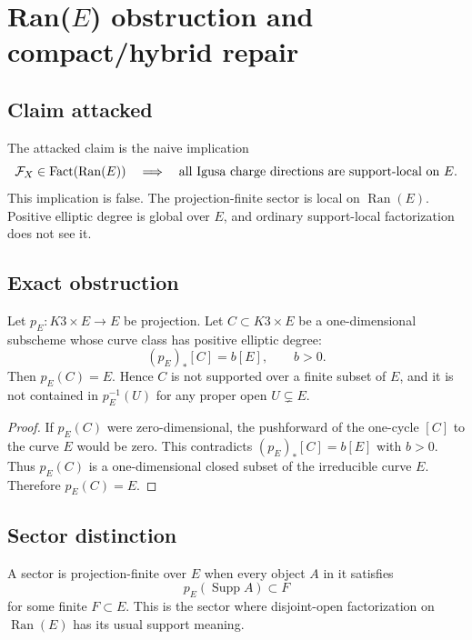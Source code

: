 \section{Ran(\(E\)) obstruction and compact/hybrid repair}
\label{sec:ranE-obstruction-attack-repair}

\subsection{Claim attacked}

The attacked claim is the naive implication
\[
\mathcal F_X\in\mathrm{Fact}(\operatorname{Ran}(E))
\quad\Longrightarrow\quad
\hbox{all Igusa charge directions are support-local on }E.
\]
This implication is false.  The projection-finite sector is local on
\(\operatorname{Ran}(E)\).  Positive elliptic degree is global over
\(E\), and ordinary support-local factorization does not see it.

\subsection{Exact obstruction}

\begin{theorem}
Let \(p_E:K3\times E\to E\) be projection.  Let
\(C\subset K3\times E\) be a one-dimensional subscheme whose curve class
has positive elliptic degree:
\[
(p_E)_*[C]=b[E],\qquad b>0.
\]
Then \(p_E(C)=E\).  Hence \(C\) is not supported over a finite subset of
\(E\), and it is not contained in \(p_E^{-1}(U)\) for any proper open
\(U\subsetneq E\).
\end{theorem}

\begin{proof}
If \(p_E(C)\) were zero-dimensional, the pushforward of the one-cycle
\([C]\) to the curve \(E\) would be zero.  This contradicts
\((p_E)_*[C]=b[E]\) with \(b>0\).  Thus \(p_E(C)\) is a one-dimensional
closed subset of the irreducible curve \(E\).  Therefore \(p_E(C)=E\).
\end{proof}

\subsection{Sector distinction}

A sector is projection-finite over \(E\) when every object \(A\) in it
satisfies
\[
p_E(\operatorname{Supp}A)\subset F
\]
for some finite \(F\subset E\).  This is the sector where disjoint-open
factorization on \(\operatorname{Ran}(E)\) has its usual support
meaning.

